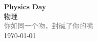 \vspace*{\fill}
\begin{center}
    \textcolor{orange!50}{\Huge\textbf{Physics Day}} \\[1em]
    \textcolor{orange!60!pink}{\Large 物理} \\[2em]
    \textcolor{gray}{\large 你如同一个吻，封碱了你的嘴} \\[1em]
    \today
\end{center}
\vspace*{\fill}
\clearpage


\clearpage

\clearpage
